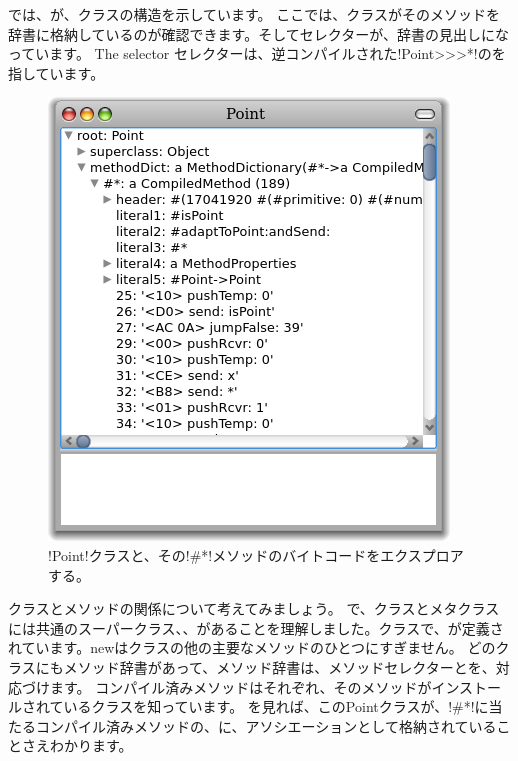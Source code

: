 \documentclass[a4paper,10pt,twoside]{book}
\begin{document}

では、が、クラスの構造を示しています。
ここでは、クラスがそのメソッドを辞書に格納しているのが確認できます。そしてセレクターが、辞書の見出しになっています。
The selector \ct{#*}セレクターは、逆コンパイルされた\ct!Point>>>*!のを指しています。

\begin{figure}[ht]\centering
	\includegraphics[width=.5\linewidth]{CompiledMethod}
	\caption{\ct!Point!クラスと、その\ct!\#*!メソッドのバイトコードをエクスプロアする。} %
\end{figure}

クラスとメソッドの関係について考えてみましょう。
で、クラスとメタクラスには共通のスーパークラス、、があることを理解しました。クラスで、が定義されています。newはクラスの他の主要なメソッドのひとつにすぎません。%
どのクラスにもメソッド辞書があって、メソッド辞書は、メソッドセレクターとを、対応づけます。
コンパイル済みメソッドはそれぞれ、そのメソッドがインストールされているクラスを知っています。
を見れば、このPointクラスが、\ct!\#*!に当たるコンパイル済みメソッドの、に、アソシエーションとして格納されていることさえわかります。
\end{document}
